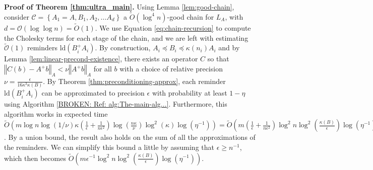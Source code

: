 \textbf{Proof of Theorem \ref{thm:ultra_main}.} Using Lemma \ref{lem:good-chain},
consider $\mathcal{C}=\left\{ A_{1}=A,B_{1},A_{2},\dots A_{d}\right\} $
a $\tilde{O}\left(\log^{4}n\right)$-good chain for $L_{A}$, with
$d=\mathcal{O}\left(\log\log n\right)=\tilde{O}\left(1\right)$. We
use Equation \ref{eq:chain-recursion} to compute the Cholesky terms
for each stage of the chain, and we are left with estimating $\tilde{\mathcal{O}}\left(1\right)$
reminders $\text{ld}\left(B_{i}^{+}A_{i}\right)$. By construction,
$A_{i}\preceq B_{i}\preceq\kappa\left(n_{i}\right)A_{i}$ and by Lemma
\ref{lem:linear-precond-existence}, there exists an operator $C$
so that $\left\Vert C\left(b\right)-A^{+}b\right\Vert _{A}<\nu\left\Vert A^{+}b\right\Vert _{A}$
for all $b$ with a choice of relative precision $\nu=\frac{\epsilon}{16\kappa^{3}\kappa\left(B\right)}$.
By Theorem \ref{thm:preconditioning-approx}, each reminder $\text{ld}\left(B_{i}^{+}A_{i}\right)$
can be approximated to precision $\epsilon$ with probability at least
$1-\eta$ using Algorithm \ref{BROKEN: Ref: alg:The-main-alg...}.
Furthermore, this algorithm works in expected time $\tilde{O}\left(m\log n\log\left(1/\nu\right)\kappa\left(\frac{1}{\epsilon}+\frac{1}{n\epsilon^{2}}\right)\log\left(\frac{n\kappa}{\nu}\right)\log^{2}\left(\kappa\right)\log\left(\eta^{-1}\right)\right)=\tilde{O}\left(m\left(\frac{1}{\epsilon}+\frac{1}{n\epsilon^{2}}\right)\log^{2}n\log^{2}\left(\frac{\kappa\left(B\right)}{\epsilon}\right)\log\left(\eta^{-1}\right)\right)$.
By a union bound, the result also holds on the sum of all the approximations
of the reminders. We can simplify this bound a little by assuming
that $\epsilon\geq n^{-1}$, which then becomes $\tilde{O}\left(m\epsilon^{-1}\log^{2}n\log^{2}\left(\frac{\kappa\left(B\right)}{\epsilon}\right)\log\left(\eta^{-1}\right)\right)$.
